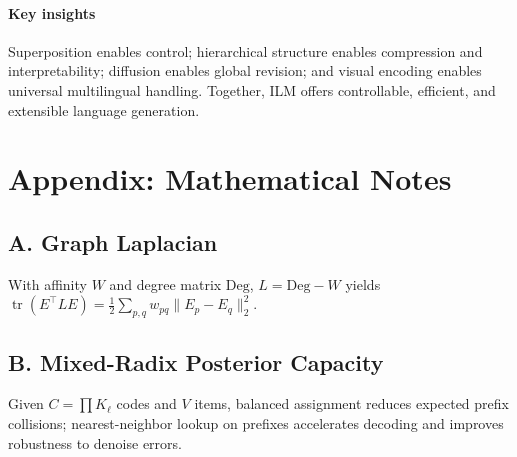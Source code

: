 \documentclass[11pt]{article}
\begin{document}
\paragraph{Key insights} Superposition enables control; hierarchical structure enables compression and interpretability; diffusion enables global revision; and visual encoding enables universal multilingual handling. Together, ILM offers controllable, efficient, and extensible language generation.

\section*{Appendix: Mathematical Notes}
\subsection*{A. Graph Laplacian}
With affinity $W$ and degree matrix $\mathrm{Deg}$, $L{=}\mathrm{Deg}{-}W$ yields $\operatorname{tr}(E^\top L E){=}\tfrac{1}{2}\sum_{p,q}w_{pq}\|E_p{-}E_q\|_2^2$.

\subsection*{B. Mixed-Radix Posterior Capacity}
Given $C{=}\prod K_\ell$ codes and $V$ items, balanced assignment reduces expected prefix collisions; nearest-neighbor lookup on prefixes accelerates decoding and improves robustness to denoise errors.
\end{document}
